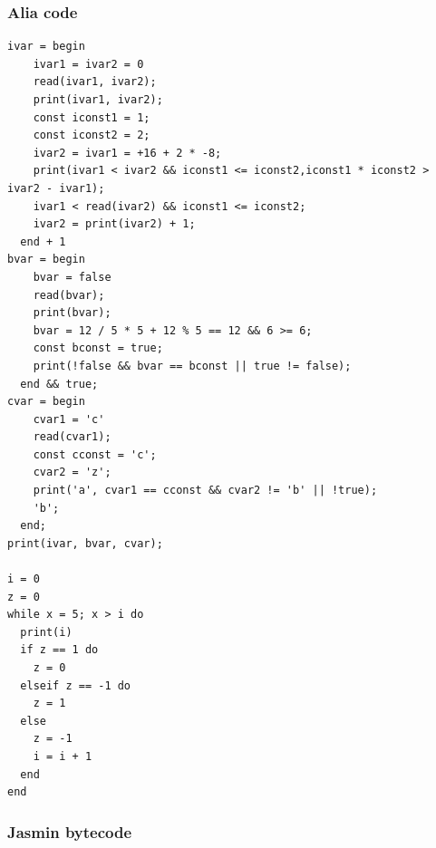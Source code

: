 \documentclass[paper=a4, fontsize=11pt]{article}
\numberwithin{equation}{section}		%
\numberwithin{figure}{section}			%
\numberwithin{table}{section}				%
\begin{document}
\subsubsection{Alia code}
\begin{lstlisting}[style=muchcode]
ivar = begin
    ivar1 = ivar2 = 0
    read(ivar1, ivar2);
    print(ivar1, ivar2);
    const iconst1 = 1;
    const iconst2 = 2;
    ivar2 = ivar1 = +16 + 2 * -8;
    print(ivar1 < ivar2 && iconst1 <= iconst2,iconst1 * iconst2 > ivar2 - ivar1);
    ivar1 < read(ivar2) && iconst1 <= iconst2;
    ivar2 = print(ivar2) + 1;
  end + 1
bvar = begin
    bvar = false
    read(bvar);
    print(bvar);
    bvar = 12 / 5 * 5 + 12 % 5 == 12 && 6 >= 6;
    const bconst = true;
    print(!false && bvar == bconst || true != false);
  end && true;
cvar = begin
    cvar1 = 'c'
    read(cvar1);
    const cconst = 'c';
    cvar2 = 'z';
    print('a', cvar1 == cconst && cvar2 != 'b' || !true);
    'b';
  end;
print(ivar, bvar, cvar);

i = 0
z = 0
while x = 5; x > i do
  print(i)
  if z == 1 do
    z = 0
  elseif z == -1 do
    z = 1
  else
    z = -1
    i = i + 1
  end
end
\end{lstlisting}

\subsubsection{Jasmin bytecode}




% 
\end{document}
